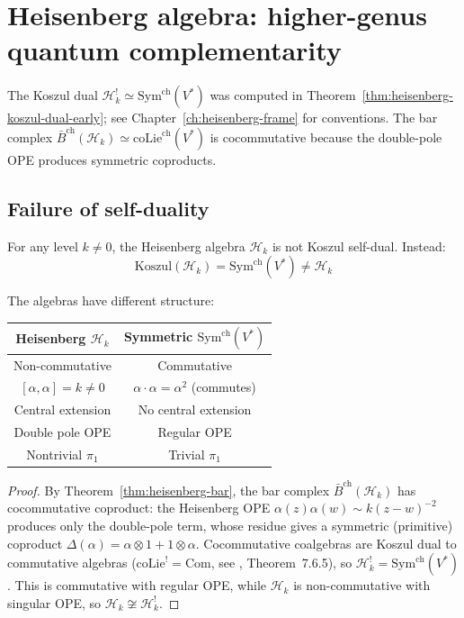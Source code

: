 \section{Heisenberg algebra: higher-genus quantum complementarity}
\label{sec:heisenberg-koszul}


The Koszul dual $\mathcal{H}_k^! \simeq \mathrm{Sym}^{\mathrm{ch}}(V^*)$ was computed in Theorem~\ref{thm:heisenberg-koszul-dual-early}; see Chapter~\ref{ch:heisenberg-frame} for conventions.  The bar complex $\bar{B}^{\mathrm{ch}}(\mathcal{H}_k) \simeq \mathrm{coLie}^{\mathrm{ch}}(V^*)$ is cocommutative because the double-pole OPE produces symmetric coproducts.

\subsection{Failure of self-duality}

\begin{theorem}
\label{thm:heisenberg-not-self-dual}
For any level $k \neq 0$, the Heisenberg algebra $\mathcal{H}_k$ is not Koszul 
self-dual. Instead:
\[\text{Koszul}(\mathcal{H}_k) = \mathrm{Sym}^{\mathrm{ch}}(V^*) \neq \mathcal{H}_k\]

The algebras have different structure:
\begin{center}
\begin{tabular}{c|c}
\textbf{Heisenberg } $\mathcal{H}_k$ & \textbf{Symmetric } $\mathrm{Sym}^{\mathrm{ch}}(V^*)$ \\ \hline
Non-commutative & Commutative \\
$[\alpha, \alpha] = k \neq 0$ & $\alpha \cdot \alpha = \alpha^2$ (commutes) \\
Central extension & No central extension \\
Double pole OPE & Regular OPE \\
Nontrivial $\pi_1$ & Trivial $\pi_1$
\end{tabular}
\end{center}
\end{theorem}

\begin{proof}
By Theorem~\ref{thm:heisenberg-bar}, the bar complex $\bar{B}^{\mathrm{ch}}(\mathcal{H}_k)$ has cocommutative coproduct: the Heisenberg OPE $\alpha(z)\alpha(w) \sim k(z-w)^{-2}$ produces only the double-pole term, whose residue gives a symmetric (primitive) coproduct $\Delta(\alpha) = \alpha \otimes 1 + 1 \otimes \alpha$.  Cocommutative coalgebras are Koszul dual to commutative algebras ($\mathrm{coLie}^! = \mathrm{Com}$, see \cite{LodayVallette}, Theorem~7.6.5), so $\mathcal{H}_k^! = \mathrm{Sym}^{\mathrm{ch}}(V^*)$.  This is commutative with regular OPE, while $\mathcal{H}_k$ is non-commutative with singular OPE, so $\mathcal{H}_k \not\cong \mathcal{H}_k^!$.
\end{proof}

